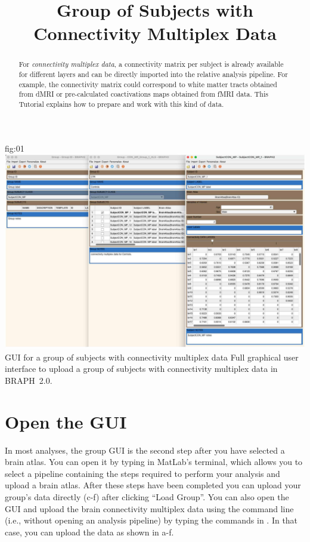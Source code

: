 \documentclass[justified]{tufte-handout}
\title{Group of Subjects with Connectivity Multiplex Data}
\begin{document}
\maketitle

\begin{abstract}
\noindent
For \emph{connectivity multiplex data}, a connectivity matrix per subject is already available for different layers and can be directly imported into the relative analysis pipeline. For example, the connectivity matrix could correspond to white matter tracts obtained from dMRI or pre-calculated coactivations maps obtained from fMRI data.
This Tutorial explains how to prepare and work with this kind of data.
\end{abstract}

\tableofcontents

	{fig:01}
	{\includegraphics{fig01.jpg}}
	{GUI for a group of subjects with connectivity multiplex data}
	{
	Full graphical user interface to upload a group of subjects with connectivity multiplex data in BRAPH~2.0. 
	}

\clearpage
\section{Open the GUI}

In most analyses, the group GUI is the second step after you have selected a brain atlas. You can open it by typing  in MatLab's terminal, which allows you to select a pipeline containing the steps required to perform your analysis and upload a brain atlas. After these steps have been completed you can upload your group's data directly (c-f) after clicking ``Load Group''. You can also open the GUI and upload the brain connectivity multiplex data using the command line (i.e., without opening an analysis pipeline) by typing the commands in . In that case, you can upload the data as shown in a-f.
\end{document}
